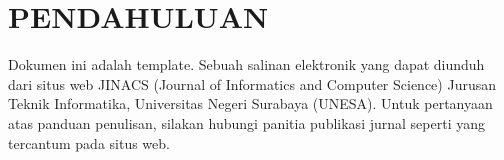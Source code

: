 
\section{\MakeUppercase{Pendahuluan}}
Dokumen ini adalah template. Sebuah salinan elektronik yang dapat diunduh dari situs web JINACS (Journal of Informatics and Computer Science) Jurusan Teknik Informatika, Universitas Negeri Surabaya (UNESA). Untuk pertanyaan atas panduan penulisan, silakan hubungi panitia publikasi jurnal seperti yang tercantum pada situs web.

